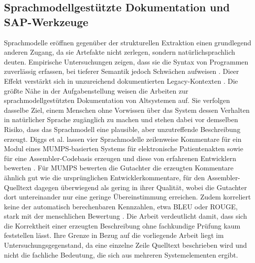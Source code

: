 \subsection{Sprachmodellgestützte Dokumentation und SAP-Werkzeuge}
\label{subsec:rw-sap}

Sprachmodelle eröffnen gegenüber der strukturellen Extraktion einen grundlegend anderen Zugang, da sie Artefakte nicht zerlegen, sondern natürlichsprachlich deuten. Empirische Untersuchungen zeigen, dass sie die Syntax von Programmen zuverlässig erfassen, bei tieferer Semantik jedoch Schwächen aufweisen \cite{ma_exploring_2026}. Dieer Effekt verstärkt sich in unzureichend dokumentierten Legacy-Kontexten \cite{sabetto_impact_2025}. Die größte Nähe in der Aufgabenstellung weisen die Arbeiten zur sprachmodellgestützten Dokumentation von Altsystemen auf. Sie verfolgen dasselbe Ziel, einem Menschen ohne Vorwissen über das System dessen Verhalten in natürlicher Sprache zugänglich zu machen und stehen dabei vor demselben Risiko, dass das Sprachmodell eine plausible, aber unzutreffende Beschreibung erzeugt.
Diggs et al. lassen vier Sprachmodelle zeilenweise Kommentare für ein Modul eines MUMPS-basierten Systems für elektronische Patientenakten sowie für eine Assembler-Codebasis erzeugen und diese von erfahrenen Entwicklern bewerten \cite{diggs_leveraging_2024}. Für MUMPS bewerten die Gutachter die erzeugten Kommentare ähnlich gut wie die ursprünglichen Entwicklerkommentare, für den Assembler-Quelltext dagegen überwiegend als gering in ihrer Qualität, wobei die Gutachter dort untereinander nur eine geringe Übereinstimmung erreichen. Zudem korreliert keine der automatisch berechenbaren Kennzahlen, etwa BLEU oder ROUGE, stark mit der menschlichen Bewertung \cite{diggs_leveraging_2024}. Die Arbeit verdeutlicht damit, dass sich die Korrektheit einer erzeugten Beschreibung ohne fachkundige Prüfung kaum feststellen lässt. Ihre Grenze in Bezug auf die vorliegende Arbeit liegt im Untersuchungsgegenstand, da eine einzelne Zeile Quelltext beschrieben wird und nicht die fachliche Bedeutung, die sich aus mehreren Systemelementen ergibt.


